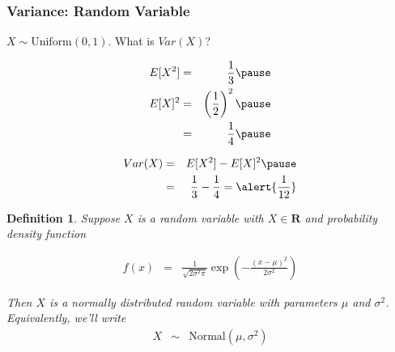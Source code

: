 \documentclass{beamer}
\newtheorem{defn}{Definition}
\numberwithin{equation}{section}
\begin{document}
\begin{frame}
\frametitle{Variance: Random Variable} 

$X \sim \text{Uniform}(0,1)$.  What is $Var(X)$? \pause   

\begin{eqnarray} 
E[X^2] & = & \frac{1}{3} \nonumber  \pause \\
E[X]^2 & = & \left(\frac{1}{2}\right)^2 \nonumber \pause \\
& = & \frac{1}{4} \nonumber \pause  
\end{eqnarray}

\begin{eqnarray}
Var(X) & =& E[X^2] - E[X]^2  \pause \nonumber \\
& = &  \frac{1}{3} - \frac{1}{4} = \alert{\frac{1}{12}} \nonumber 
\end{eqnarray}

\end{frame}



\begin{frame}

\begin{defn}
Suppose $X$ is a random variable with $X \in \mathbf{R}$ and probability density function

\begin{eqnarray}
f(x) & = & \frac{1}{\sqrt{2\sigma^2\pi}}\exp\left(-\frac{(x - \mu)^2}{2\sigma^2}\right) \nonumber 
\end{eqnarray}

Then $X$ is a \alert{normally} distributed random variable with parameters $\mu$ and $\sigma^2$.  \\


Equivalently, we'll write 
\begin{eqnarray}
X & \sim & \text{Normal}(\mu, \sigma^2) \nonumber 
\end{eqnarray}




\end{defn}
\end{frame}
\end{document}
